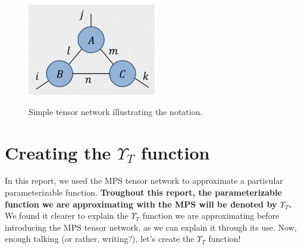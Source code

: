 \documentclass{article}
\theoremstyle{definition}
\theoremstyle{definition}
\begin{document}
\begin{figure}[h]
\centering
\caption{Simple tensor network illustrating the notation.}
\includegraphics[width=0.5\textwidth]{images/2023-03-21-10-22-39.png}
\label{fig:tensor_net}
\end{figure}

\section{Creating the $\Upsilon_{T}$ function}
In this report, we used the MPS tensor network to approximate a particular parameterizable function.
{\bf Troughout this report, the parameterizable function we are approximating with the MPS will be denoted by $\Upsilon_{T}$. }
We found it clearer to explain the $\Upsilon_{T}$ function we are approximating before introducing the MPS tensor network, as we can explain it through its use.
Now, enough talking (or rather, writing?), let's create the $\Upsilon_{T}$ function!
\end{document}
